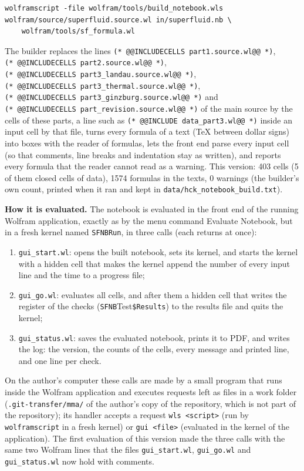 \documentclass[
  10pt,
]{article}
\providecommand{\tightlist}{%
  \setlength{\itemsep}{0pt}\setlength{\parskip}{0pt}}
\begin{document}
\begin{verbatim}
wolframscript -file wolfram/tools/build_notebook.wls wolfram/source/superfluid.source.wl in/superfluid.nb \
    wolfram/tools/sf_formula.wl
\end{verbatim}

The builder replaces the lines
\texttt{(*\ @@INCLUDECELLS\ part1.source.wl@@\ *)},
\texttt{(*\ @@INCLUDECELLS\ part2.source.wl@@\ *)},
\texttt{(*\ @@INCLUDECELLS\ part3\_landau.source.wl@@\ *)},
\texttt{(*\ @@INCLUDECELLS\ part3\_thermal.source.wl@@\ *)},
\texttt{(*\ @@INCLUDECELLS\ part3\_ginzburg.source.wl@@\ *)} and
\texttt{(*\ @@INCLUDECELLS\ part\_revision.source.wl@@\ *)} of the main
source by the cells of these parts, a line such as
\texttt{(*\ @@INCLUDE\ data\_part3.wl@@\ *)} inside an input cell by
that file, turns every formula of a text (TeX between dollar signs) into
boxes with the reader of formulas, lets the front end parse every input
cell (so that comments, line breaks and indentation stay as written),
and reports every formula that the reader cannot read as a warning. This
version: 403 cells (5 of them closed cells of data), 1574 formulas in
the texts, 0 warnings (the builder's own count, printed when it ran and
kept in \texttt{data/hck\_notebook\_build.txt}).

\textbf{How it is evaluated.} The notebook is evaluated in the front end
of the running Wolfram application, exactly as by the menu command
Evaluate Notebook, but in a fresh kernel named \texttt{SFNBRun}, in
three calls (each returns at once):

\begin{enumerate}
\def\labelenumi{\arabic{enumi}.}
\tightlist
\item
  \texttt{gui\_start.wl}: opens the built notebook, sets its kernel, and
  starts the kernel with a hidden cell that makes the kernel append the
  number of every input line and the time to a progress file;
\item
  \texttt{gui\_go.wl}: evaluates all cells, and after them a hidden cell
  that writes the register of the checks
  (\texttt{SFNB}Test\texttt{\$Results}) to the results file and quits
  the kernel;
\item
  \texttt{gui\_status.wl}: saves the evaluated notebook, prints it to
  PDF, and writes the log: the version, the counts of the cells, every
  message and printed line, and one line per check.
\end{enumerate}

On the author's computer these calls are made by a small program that
runs inside the Wolfram application and executes requests left as files
in a work folder (\texttt{.git-transfer/mma/} of the author's copy of
the repository, which is not part of the repository); its handler
accepts a request \texttt{wls\ \textless{}script\textgreater{}} (run by
\texttt{wolframscript} in a fresh kernel) or
\texttt{gui\ \textless{}file\textgreater{}} (evaluated in the kernel of
the application). The first evaluation of this version made the three
calls with the same two Wolfram lines that the files
\texttt{gui\_start.wl}, \texttt{gui\_go.wl} and \texttt{gui\_status.wl}
now hold with comments.
\end{document}
